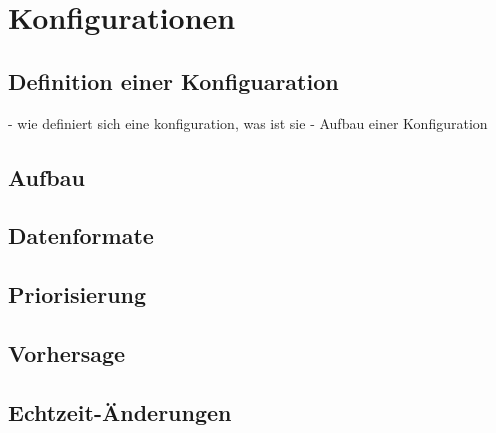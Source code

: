 \chapter{Konfigurationen}

\section{Definition einer Konfiguaration}
- wie definiert sich eine konfiguration, was ist sie
- Aufbau einer Konfiguration

\section{Aufbau}
\section{Datenformate}




\section{Priorisierung}
\section{Vorhersage}
\section{Echtzeit-Änderungen}
